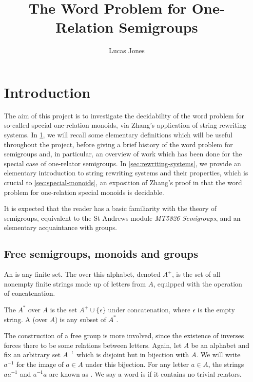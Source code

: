\documentclass[noindex,noinsetproof,12pt]{lmaths}
\title{The Word Problem for One-Relation Semigroups}
\author{Lucas Jones}
\begin{document}
\maketitle
\bigskip
\tableofcontents

\section{Introduction} \label{sec:intro}

The aim of this project is to investigate the decidability of the word problem for so-called special one-relation monoids, via Zhang's application of string rewriting systems. In \cref{sec:intro}, we will recall some elementary definitions which will be useful throughout the project, before giving a brief history of the word problem for semigroups and, in particular, an overview of work which has been done for the special case of one-relator semigroups. In \cref{sec:rewriting-systems}, we provide an elementary introduction to string rewriting systems and their properties, which is crucial to \cref{sec:special-monoids}, an exposition of Zhang's proof in \cite{Zhang1992a} that the word problem for one-relation special monoids is decidable.

It is expected that the reader has a basic familiarity with the theory of semigroups, equivalent to the St Andrews module \emph{MT5826 Semigroups}, and an elementary acquaintance with groups.

\subsection{Free semigroups, monoids and groups}

An  is any finite set. The  over this alphabet, denoted $A^{+}$, is the set of all nonempty finite strings made up of letters from $A$, equipped with the operation of concatenation.

The  $A^*$ over $A$ is the set $A^+ \cup \{\epsilon\}$ under concatenation, where $\epsilon$ is the empty string. A  (over $A$) is any subset of $A^*$.

The construction of a free group is more involved, since the existence of inverses forces there to be some relations between letters. Again, let $A$ be an alphabet and fix an arbitrary set $A^{-1}$ which is disjoint but in bijection with $A$. We will write $a^{-1}$ for the image of $a \in A$ under this bijection. For any letter $a \in A$, the strings $aa^{-1}$ and $a^{-1}a$ are known as . We say a word is  if it contains no trivial relators.
\end{document}
